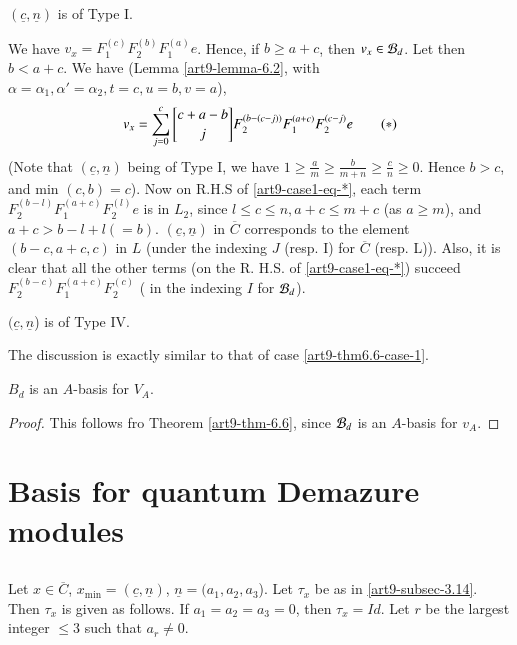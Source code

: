 \setcounter{case}{0}
\begin{case}\label{art9-thm6.6-case-1}
$(\underline{c},\underline{n})$ is of Type I.

We have $v_{x}= F_{1}^{(c)}F_{2}^{(b)}F_{1}^{(a)}e$. Hence, if $b \geq a + c$, then $v_{x} \in \mathcal{B}_{d}$. Let then $b < a + c$. We have (Lemma \ref{art9-lemma-6.2}, with $\alpha = \alpha_{1}, \alpha' = \alpha_{2}, t =c, u=b, v=a$),
\begin{equation}\label{art9-case1-eq-*}
v_{x} = \sum\limits_{j=0}^{c}\chsfk{c + a-b}{j} F_{2}^{(b-(c-j))}F_{1}^{(a+c)}F_{2}^{(c-j)}e\tag{$\ast$}
\end{equation}
(Note that $(\underline{c}, \underline{n})$ being of Type I, we have
$1 \geq \frac{a}{m} \geq \frac{b}{m+n} \geq \frac{c}{n} \geq 0$. Hence $b > c$, and min $(c,b)=c$). Now on R.H.S of \eqref{art9-case1-eq-*}, each term $F_{2}^{(b-l)}F_{1}^{(a+c)}F_{2}^{(l)}e$ is in $L_{2}$, since $l \leq  c \leq n, a + c\leq m + c$ (as $a \geq m$), and $a+ c > b-l + l (= b)$. $(\underline{c}, \underline{n})$ in $\overline{C}$ corresponds to the element $(b-c, a+ c, c)$ in $L$ (under the indexing $J$ (resp. I) for $\overline{C}$ (resp. L)). Also, it is clear that all the other terms (on the R. H.S.
of \eqref{art9-case1-eq-*}) succeed $F_{2}^{(b-c)}F_{1}^{(a+ c)}F_{2}^{(c)}$ ( in the indexing $I$ for $\mathcal{B}_{d}$). 
\end{case}

\begin{case}\label{art9-thm6.6-case-2}
$(\underline{c},\underline{n}$) is of Type IV.

The discussion is exactly similar to that of case \ref{art9-thm6.6-case-1}.
\end{case}

\setcounter{theorem}{6}
\begin{theorem}\label{art9-thm-6.7}
$B_{d}$ is an $A$-basis for $V_{A}$.
\end{theorem}

\begin{proof}
This follows fro  Theorem \ref{art9-thm-6.6}, since $\mathcal{B}_{d}$ is an $A$-basis for $v_{A}$.
\end{proof}

\section{Basis for quantum Demazure modules}\label{art9-sec-7}

\subsection{}\label{art9-subsec-7.1}
Let $x \in \overline{C}$, $x_{\min} = (\underline{c}, \underline{n})$, $\underline{n} = (a_{1}, a_{2},a_{3}$). Let $\tau_{x}$ be as in
\ref{art9-subsec-3.14}. Then $\tau_{x}$ is given as follows. If $a_{1}= a_{2} =a_{3} = 0$, then $\tau_{x}= Id$. Let $r$ be the largest integer $\leq 3$ such that $a_{r}  \neq 0$. 

